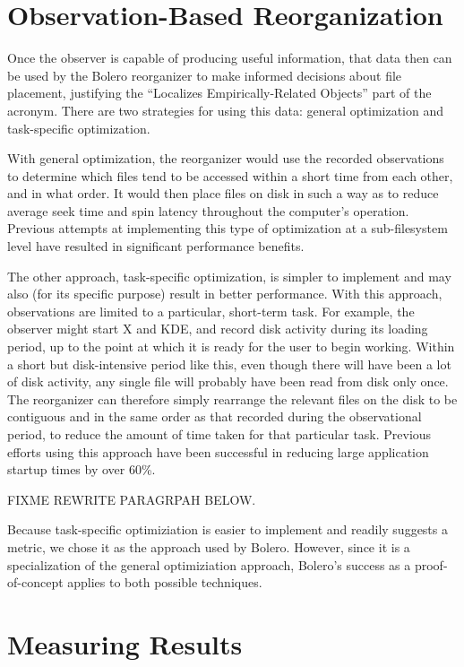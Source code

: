 \documentclass[10pt,twocolumn,letterpaper]{article}
\begin{document}
\section{Observation-Based Reorganization}

Once the observer is capable of producing useful information, that data then can be used
by the Bolero reorganizer to make informed decisions about file placement, justifying the
``Localizes Empirically-Related Objects'' part of the acronym. There are two
strategies for using this data: general optimization and task-specific optimization.

With general optimization, the reorganizer would use the recorded observations
to determine which files tend to be accessed within a short time from each
other, and in what order. It would then place files on disk in such a way as
to reduce average seek time and spin latency throughout the computer's operation.
Previous attempts at implementing this type of optimization at a
sub-filesystem level have resulted in significant performance benefits\cite{autolocality}.

The other approach, task-specific optimization, is simpler to
implement and may also (for its specific purpose) result in better performance. With this
approach, observations are limited to a particular, short-term task. For example,
the observer might start X and KDE, and record disk activity during its loading period,
up to the point at which it is ready for the user to begin working.
Within a short but disk-intensive period like this, even
though there will have been a lot of disk activity, any single file will
probably have been read from disk only once. The reorganizer can therefore simply
rearrange the relevant files on the disk to be contiguous and in the same order as that
recorded during the observational period, to reduce the amount of time taken for
that particular task. Previous efforts using this approach have been
successful in reducing large application startup times by over 60\%\cite{ala}.

FIXME REWRITE PARAGRPAH BELOW.

Because task-specific optimiziation is easier to implement and readily suggests
a metric, we chose it as the approach used by Bolero. However, since it is a
specialization of the general optimiziation approach, Bolero's success as
a proof-of-concept applies to both possible techniques.

\section{Measuring Results}
\end{document}
